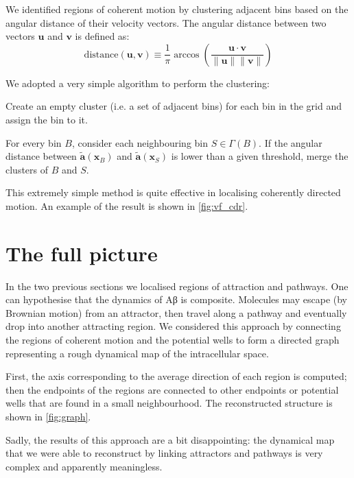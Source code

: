 We identified regions of coherent motion by clustering adjacent bins based on the angular distance of their  velocity vectors. The angular distance between two vectors $\bm{u}$ and $\bm{v}$ is defined as:
\begin{equation} \label{eq:angular-similarity}
 \mathrm{distance}(\bm{u}, \bm{v}) \equiv \frac{1}{\pi} \arccos\left(\frac{\bm{u} \cdot \bm{v}}{\|\bm{u}\| \|\bm{v}\|}\right)
\end{equation}

\noindent We adopted a very simple algorithm to perform the clustering:
\begin{enumerate}
 \begin{item}
       Create an empty cluster (i.e. a set of adjacent bins) for each bin in the grid and assign the bin to it.
\end{item}
\begin{item}
      For every bin $B$, consider each neighbouring bin $S \in \Gamma(B)$. If the angular distance between $\tilde{\bm{a}}(\bm{x}_B)$ and $\tilde{\bm{a}}(\bm{x}_S)$ is lower than a given threshold, merge the clusters of $B$ and $S$.
\end{item}
\end{enumerate}

\noindent This extremely simple method is quite effective in localising coherently directed motion. An example of the result is shown in \cref{fig:vf_cdr}.


\section{The full picture}\label{sec:full_picture}

In the two previous sections we localised regions of attraction and pathways. One can hypothesise that the dynamics of Aβ is composite. Molecules may escape (by Brownian motion) from an attractor, then travel along a pathway and eventually drop into another attracting region. We considered this approach by connecting the regions of coherent motion and the potential wells to form a directed graph representing a rough dynamical map of the intracellular space.

First, the axis corresponding to the average direction of each region is computed; then the endpoints of the regions are connected to other endpoints or potential wells that are found in a small neighbourhood. The reconstructed structure is shown in \cref{fig:graph}.

Sadly, the results of this approach are a bit disappointing: the dynamical map that we were able to reconstruct by linking attractors and pathways is very complex and apparently meaningless.

